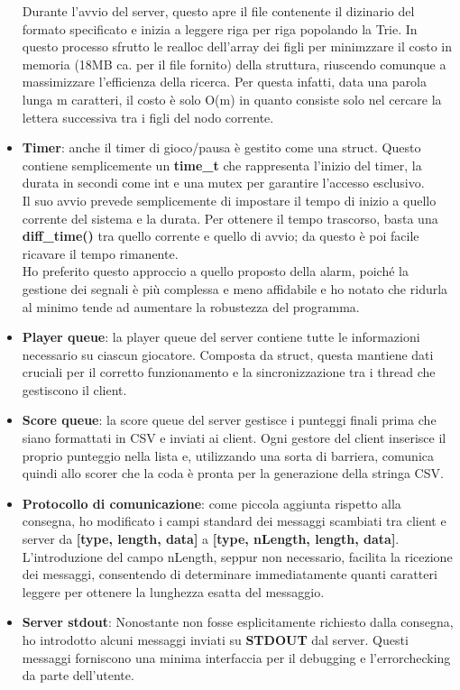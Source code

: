 \documentclass[a4paper]{article}
\begin{document}
\begin{itemize}
        Durante l'avvio del server, questo apre il file contenente il dizinario del formato specificato e inizia a leggere riga per riga popolando la Trie. In questo processo sfrutto le realloc dell'array dei figli per minimzzare il costo in memoria (18MB ca. per il file fornito) della struttura, riuscendo comunque a massimizzare l'efficienza della ricerca. Per questa infatti, data una parola lunga m caratteri, il costo è solo O(m) in quanto consiste solo nel cercare la lettera successiva tra i figli del nodo corrente.
        \item \textbf{Timer}: anche il timer di gioco/pausa è gestito come una struct. Questo contiene semplicemente un \textbf{time\_t} che rappresenta l'inizio del timer, la durata in secondi come int e una mutex per garantire l'accesso esclusivo. \\Il suo avvio prevede semplicemente di impostare il tempo di inizio a quello corrente del sistema e la durata. Per ottenere il tempo trascorso, basta una \textbf{diff\_time()} tra quello corrente e quello di avvio; da questo è poi facile ricavare il tempo rimanente. \\Ho preferito questo approccio a quello proposto della alarm, poiché la gestione dei segnali è più complessa e meno affidabile e ho notato che ridurla al minimo tende ad aumentare la robustezza del programma.
        \item \textbf{Player queue}: la player queue del server contiene tutte le informazioni necessario su ciascun giocatore. Composta da struct, questa mantiene dati cruciali per il corretto funzionamento e la sincronizzazione tra i thread che gestiscono il client.  
        \item \textbf{Score queue}: la score queue del server gestisce i punteggi finali prima che siano formattati in CSV e inviati ai client. Ogni gestore del client inserisce il proprio punteggio nella lista e, utilizzando una sorta di barriera, comunica quindi allo scorer che la coda è pronta per la generazione della stringa CSV.   
        \item \textbf{Protocollo di comunicazione}: come piccola aggiunta rispetto alla consegna, ho modificato i campi standard dei messaggi scambiati tra client e server da \textbf{[type, length, data]} a \textbf{[type, nLength, length, data]}. L'introduzione del campo nLength, seppur non necessario, facilita la ricezione dei messaggi, consentendo di determinare immediatamente quanti caratteri leggere per ottenere la lunghezza esatta del messaggio.
        \item \textbf{Server stdout}: Nonostante non fosse esplicitamente richiesto dalla consegna, ho introdotto alcuni messaggi inviati su \textbf{STDOUT} dal server. Questi messaggi forniscono una minima interfaccia per il debugging e l'errorchecking da parte dell'utente.

\end{itemize}
\end{document}
